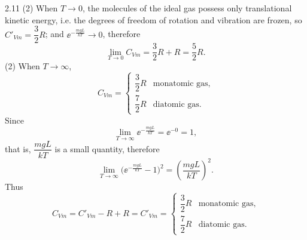 \begin{solution}{2.11}
(2) When $T\to0$, the molecules of the ideal gas possess only translational kinetic energy, i.e. the degrees of freedom of rotation and vibration are frozen, so $C'_{Vm}=\dfrac{3}{2}R$; and $\ee^{-\frac{mgL}{kT}}\to0$, therefore
\[
\lim_{T\to0}C_{Vm}=\frac{3}{2}R+R=\frac{5}{2}R.
\]
(2) When $T\to\infty$,
\[
C_{Vm}=
\begin{cases}
\dfrac{3}{2}R & \text{monatomic gas},\\[8pt]
\dfrac{7}{2}R & \text{diatomic gas}.
\end{cases}
\]
Since
\[
\lim_{T\to\infty}\ee^{-\frac{mgL}{kT}}=\ee^{-0}=1,
\]
that is, $\dfrac{mgL}{kT}$ is a small quantity, therefore
\[
\lim_{T\to\infty}\bigl(\ee^{-\frac{mgL}{kT}}-1\bigr)^2=\left(\frac{mgL}{kT}\right)^2.
\]
Thus
\[
C_{Vm}=C'_{Vm}-R+R=C'_{Vm}=
\begin{cases}
\dfrac{3}{2}R & \text{monatomic gas},\\[8pt]
\dfrac{7}{2}R & \text{diatomic gas}.
\end{cases}
\]
\end{solution}

